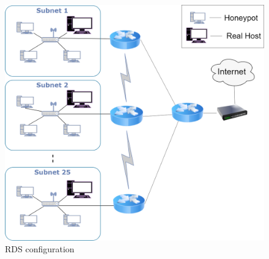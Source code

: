 \FloatBarrier
\begin{figure}[!htbp]
\centering
  \includegraphics[scale=0.2]{Chap4/RDSConfig.png}
  \caption{RDS configuration}\label{fig:figure14}
\end{figure} 



